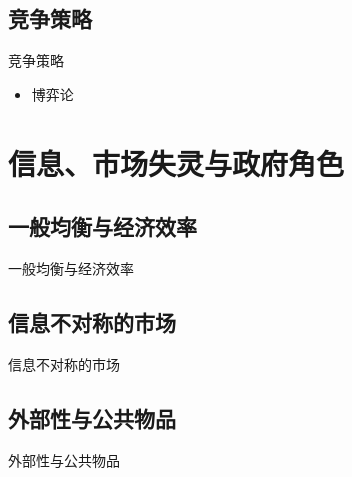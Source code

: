 \documentclass[UTF8]{ctexbeamer}
\begin{document}
\subsection{竞争策略}
\begin{frame}{竞争策略}
\begin{itemize}
\item 博弈论
\end{itemize}
\end{frame}

\section{ 信息、市场失灵与政府角色}

\subsection{一般均衡与经济效率}
\begin{frame}{一般均衡与经济效率}
\end{frame}


\subsection{信息不对称的市场}
\begin{frame}{信息不对称的市场}
\end{frame}

\subsection{外部性与公共物品}
\begin{frame}{外部性与公共物品}
\end{frame}


\end{document}
